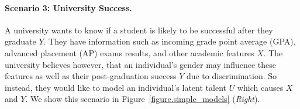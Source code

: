 
\paragraph{Scenario 3: University Success.}
A university wants to know if a student is likely to be successful after they graduate $Y$. They have information such as incoming grade point average (GPA), advanced placement (AP) exams results, and other academic features $X$. The university believes however, that an individual's gender may influence these features as well as their post-graduation success $Y$ due to discrimination. So instead, they would like to model an individual's latent talent $U$ which causes $X$ and $Y$. We show this scenario in Figure~\ref{figure.simple_models} (\emph{Right}).






